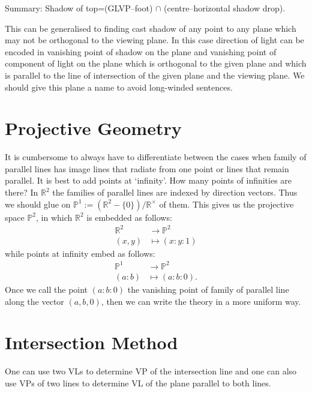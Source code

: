 \documentclass{amsart}
\newcommand{\RR}{\mathbb {R}}
\newcommand{\PP}{\mathbb {P}}
\begin{document}
Summary: Shadow of top=(GLVP--foot) $\cap$ (centre--horizontal shadow drop).

This can be generalised to finding cast shadow of any point to any plane which may not be orthogonal to the viewing plane. In this case direction of light can be encoded in vanishing point of shadow on the plane and vanishing point of component of light on the plane which is orthogonal to the given plane and which is parallel to the line of intersection of the given plane and the viewing plane. We should give this plane a name to avoid long-winded sentences.

\section{Projective Geometry}
\label{sec:projective-geometry}

It is cumbersome to always have to differentiate between the cases when family of parallel lines has image lines that radiate from one point or lines that remain parallel. It is best to add points at `infinity'. How many points of infinities are there? In $\RR^2$ the families of parallel lines are indexed by direction vectors. Thus we should glue on $\PP^1:= (\RR^2 - \{0\})/\RR^\times$ of them. This gives us the projective space $\PP^2$, in which $\RR^2$ is embedded as follows:
\begin{align*}
  \RR^2 &\rightarrow \PP^2 \\
  (x,y) &\mapsto (x:y:1)
\end{align*}
while points at infinity embed as follows:
\begin{align*}
  \PP^1 &\rightarrow \PP^2\\
  (a:b) &\mapsto (a:b:0).
\end{align*}
Once we call the point $(a:b:0)$ the vanishing point of family of parallel line along the vector $(a,b,0)$, then we can write the theory in a more uniform way.

\section{Intersection Method}
\label{sec:intersection-method}

One can use two VLs to determine VP of the intersection  line and one can also use VPs of two lines to determine VL of the plane parallel to both lines.

\end{document}
